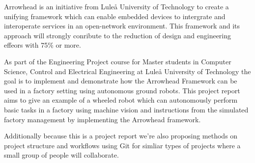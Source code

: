Arrowhead is an initiative from Luleå University of Technology to create a unifying framework which can enable embedded devices to intergrate and interoperate services in an open-network environment. This framework and its approach will strongly conribute to the reduction of design and engineering effeors with 75\% or more.

As part of the Engineering Project course for Master students in Computer Science, Control and Electrical Engineering at Luleå University of Technology the goal is to implement and demonstrate how the Arrowhead Framework can be used in a factory setting using autonomous ground robots. This project report aims to give an example of a wheeled robot which can autonomously perform basic tasks in a factory using machine vision and instructions from the simulated factory management by implementing the Arrowhead framework. 

Additionally because this is a project report we're also proposing methods on project structure and workflows using Git for simliar types of projects where a small group of people will collaborate. 
